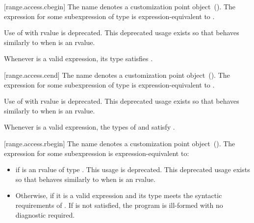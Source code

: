 {[range.access.cbegin]{}
\pnum
The name  denotes a customization point
object~(). The expression
 for some subexpression  of type 
is expression-equivalent to .

\pnum
Use of  with rvalue  is deprecated.
\enternote This deprecated usage exists so that 
behaves similarly to   when
 is an rvalue. \exitnote

\pnum
\enternote Whenever  is a valid expression, its
type satisfies . \exitnote

[range.access.cend]{}
\pnum
The name  denotes a customization point
object~(). The expression
 for some subexpression  of type 
is expression-equivalent to .

\pnum
Use of  with rvalue  is deprecated.
\enternote This deprecated usage exists so that 
behaves similarly to   when
 is an rvalue. \exitnote

\pnum
\enternote Whenever  is a valid expression, the
types of  and  satisfy
. \exitnote

[range.access.rbegin]{}
\pnum
The name  denotes a customization point
object~(). The expression
 for some subexpression  is expression-equivalent
to:

\begin{itemize}
\item
   if  is an rvalue of
  type . This usage is deprecated.
  \enternote This deprecated usage exists so that
   behaves similarly to 
   when  is an rvalue. \exitnote

\item
  Otherwise,  if it is a valid expression and its type  meets the
  syntactic requirements of . If 
  is not satisfied, the program is ill-formed with no diagnostic
  required.


\end{itemize}}
